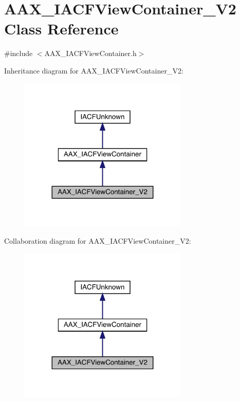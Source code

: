 \hypertarget{a01769}{}\section{A\+A\+X\+\_\+\+I\+A\+C\+F\+View\+Container\+\_\+\+V2 Class Reference}
\label{a01769}


{\ttfamily \#include $<$A\+A\+X\+\_\+\+I\+A\+C\+F\+View\+Container.\+h$>$}



Inheritance diagram for A\+A\+X\+\_\+\+I\+A\+C\+F\+View\+Container\+\_\+\+V2\+:
\nopagebreak
\begin{figure}[H]
\begin{center}
\leavevmode
\includegraphics[width=227pt]{a01768}
\end{center}
\end{figure}


Collaboration diagram for A\+A\+X\+\_\+\+I\+A\+C\+F\+View\+Container\+\_\+\+V2\+:
\nopagebreak
\begin{figure}[H]
\begin{center}
\leavevmode
\includegraphics[width=227pt]{a01767}
\end{center}
\end{figure}


